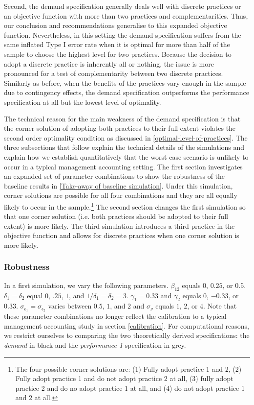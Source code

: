 \documentclass[12pt]{article}
\begin{document}
Second, the demand specification generally deals well with discrete practices or an objective function with more than two practices and complementarities. Thus, our conclusion and recommendations generalise to this expanded objective function. Nevertheless, in this setting the demand specification suffers from the same inflated Type I error rate when it is optimal for more than half of the sample to choose the highest level for two practices. Because the decision to adopt a discrete practice is inherently all or nothing, the issue is more pronounced for a test of complementarity between two discrete practices. Similarly as before, when the benefits of the practices vary enough in the sample due to contingency effects, the demand specification outperforms the performance specification at all but the lowest level of optimality.

The technical reason for the main weakness of the demand specification is that the corner solution of adopting both practices to their full extent violates the second order optimality condition as discussed in \ref{optimal-level-of-practices}. The three subsections that follow explain the technical details of the simulations and explain how we establish quantitatively that the worst case scenario is unlikely to occur in a typical management accounting setting. The first section investigates an expanded set of parameter combinations to show the robustness of the baseline results in \ref{Take-away of baseline simulation}. Under this simulation, corner solutions are possible for all four combinations and they are all equally likely to occur in the sample.\footnote{The four possible corner solutions are: (1) Fully adopt practice 1 and 2, (2) Fully adopt practice 1 and do not adopt practice 2 at all, (3) fully adopt practice 2 and do no adopt practice 1 at all, and (4) do not adopt practice 1 and 2 at all.} The second section changes the first simulation so that one corner solution (i.e. both practices should be adopted to their full extent) is more likely. The third simulation introduces a third practice in the objective function and allows for discrete practices when one corner solution is more likely. 

\subsubsection{Robustness}

In a first simulation, we vary the following parameters. $\beta_{12}$ equals $0$, $0.25$, or $0.5$. $\delta_1 = \delta_2$ equal $0$, $.25$, $1$, and $1/\delta_1 = \delta_2 = 3$. $\gamma_1 = 0.33$ and $\gamma_2$ equals $0$, $-0.33$, or $0.33$. $\sigma_{\epsilon_1} = \sigma_{\epsilon_2}$ varies between $0.5$, $1$, and $2$ and $\sigma_{\nu}$ equals $1$, $2$, or $4$. Note that these parameter combinations no longer reflect the calibration to a typical management accounting study in section \ref{calibration}. For computational reasons, we restrict ourselves to comparing the two theoretically derived specifications: the \emph{demand} in black and the \emph{performance 1} specification in grey.
\end{document}
